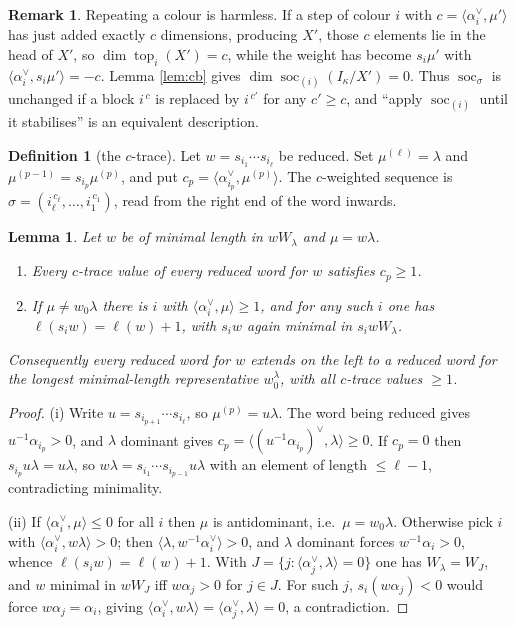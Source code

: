 \documentclass[reqno]{amsart}
\theoremstyle{plain}
\newtheorem{lemma}[theorem]{Lemma}
\theoremstyle{definition}
\newtheorem{definition}[theorem]{Definition}
\newtheorem{remark}[theorem]{Remark}
\DeclareMathOperator{\soc}{soc}
\DeclareMathOperator{\topp}{top}
\newcommand{\la}{\lambda}
\newcommand{\al}{\alpha}
\newcommand{\ka}{\kappa}
\begin{document}
\begin{remark}\label{rem:repeats}
Repeating a colour is harmless.  If a step of colour $i$ with
$c=\langle\al_i^\vee,\mu'\rangle$ has just added exactly $c$ dimensions,
producing $X'$, those $c$ elements lie in the head of $X'$, so
$\dim\topp_i(X')=c$, while the weight has become $s_i\mu'$ with
$\langle\al_i^\vee,s_i\mu'\rangle=-c$.  Lemma \ref{lem:cb} gives
$\dim\soc_{(i)}(I_\ka/X')=0$.  Thus $\soc_\sigma$ is unchanged if a block
$i^{\,c}$ is replaced by $i^{\,c'}$ for any $c'\ge c$, and ``apply
$\soc_{(i)}$ until it stabilises'' is an equivalent description.
\end{remark}

\begin{definition}[the $c$-trace]\label{def:ctrace}
Let $w=s_{i_1}\cdots s_{i_\ell}$ be reduced.  Set $\mu^{(\ell)}=\la$ and
$\mu^{(p-1)}=s_{i_p}\mu^{(p)}$, and put
$c_p=\langle\al_{i_p}^\vee,\mu^{(p)}\rangle$.  The $c$-weighted sequence is
$\sigma=(i_\ell^{\,c_\ell},\dots,i_1^{\,c_1})$, read from the right end of the
word inwards.
\end{definition}

\begin{lemma}\label{lem:extend}
Let $w$ be of minimal length in $wW_\la$ and $\mu=w\la$.
\begin{enumerate}
\item[(i)] Every $c$-trace value of every reduced word for $w$ satisfies
$c_p\ge1$.
\item[(ii)] If $\mu\ne w_0\la$ there is $i$ with
$\langle\al_i^\vee,\mu\rangle\ge1$, and for any such $i$ one has
$\ell(s_iw)=\ell(w)+1$, with $s_iw$ again minimal in $s_iwW_\la$.
\end{enumerate}
Consequently every reduced word for $w$ extends on the left to a reduced word
for the longest minimal-length representative $w_0^\la$, with all $c$-trace
values $\ge1$.
\end{lemma}

\begin{proof}
(i) Write $u=s_{i_{p+1}}\cdots s_{i_\ell}$, so $\mu^{(p)}=u\la$.  The word being
reduced gives $u^{-1}\al_{i_p}>0$, and $\la$ dominant gives
$c_p=\langle(u^{-1}\al_{i_p})^\vee,\la\rangle\ge0$.  If $c_p=0$ then
$s_{i_p}u\la=u\la$, so $w\la=s_{i_1}\cdots s_{i_{p-1}}u\la$ with an element of
length $\le\ell-1$, contradicting minimality.

(ii) If $\langle\al_i^\vee,\mu\rangle\le0$ for all $i$ then $\mu$ is
antidominant, i.e.\ $\mu=w_0\la$.  Otherwise pick $i$ with
$\langle\al_i^\vee,w\la\rangle>0$; then $\langle\la,w^{-1}\al_i^\vee\rangle>0$,
and $\la$ dominant forces $w^{-1}\al_i>0$, whence $\ell(s_iw)=\ell(w)+1$.  With
$J=\{j:\langle\al_j^\vee,\la\rangle=0\}$ one has $W_\la=W_J$, and $w$ minimal
in $wW_J$ iff $w\al_j>0$ for $j\in J$.  For such $j$, $s_i(w\al_j)<0$ would
force $w\al_j=\al_i$, giving
$\langle\al_i^\vee,w\la\rangle=\langle\al_j^\vee,\la\rangle=0$, a
contradiction.
\end{proof}
\end{document}
